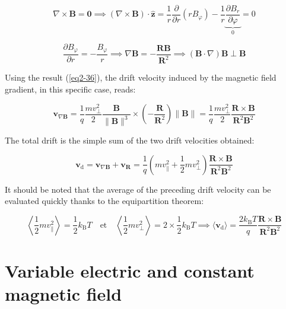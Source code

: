 \begin{equation}
    \nabla\times\mathbf{B}=\mathbf{0}\implies(\nabla\times\mathbf{B})\cdot\mathbf{\hat{z}}=\frac{1}{r}\frac{\partial}{\partial r}(rB_\varphi)-\frac{1}{r}\underbrace{\frac{\partial B_r}{\partial\varphi}}_0=0
\end{equation}

\begin{equation}
    \frac{\partial B_\varphi}{\partial r}=-\frac{B_\varphi}{r}\implies\nabla\mathbf{B}=-\frac{\mathbf{R}\mathbf{B}}{\mathbf{R}^2}\implies\left(\mathbf{B}\cdot\nabla\right)\mathbf{B}\perp\mathbf{B}
\end{equation}

Using the result (\ref{eq2-36}), the drift velocity induced by the magnetic field gradient, in this specific case, reads:

\begin{equation}
    \mathbf{v}_{\nabla\mathbf{B}}=\frac{1}{q}\frac{mv_\perp^2}{2}\frac{\mathbf{B}}{\|\mathbf{B}\|^3}\times\left(-\frac{\mathbf{R}}{\mathbf{R}^2}\right)\|\mathbf{B}\|=\frac{1}{q}\frac{mv_\perp^2}{2}\frac{\mathbf{R}\times\mathbf{B}}{\mathbf{R}^2\mathbf{B}^2}
\end{equation}

The total drift is the simple sum of the two drift velocities obtained:

\begin{equation}
    \label{eq2-48}
    \mathbf{v}_\mathrm{d}=\mathbf{v}_{\nabla\mathbf{B}}+\mathbf{v}_\mathbf{R}=\frac{1}{q}\left(mv_\parallel^2+\frac{1}{2}mv_\perp^2\right)\frac{\mathbf{R}\times\mathbf{B}}{\mathbf{R}^2\mathbf{B}^2}
\end{equation}

It should be noted that the average of the preceding drift velocity can be evaluated quickly thanks to the
equipartition theorem:

\begin{equation}
    \left\langle\frac{1}{2}mv_\parallel^2\right\rangle=\frac{1}{2}k_\text{B}T\quad\text{et}\quad\left\langle\frac{1}{2}mv_\perp^2\right\rangle=2\times\frac{1}{2}k_\text{B}T\implies\langle\mathbf{v}_\mathrm{d}\rangle=\frac{2k_\text{B}T}{q}\frac{\mathbf{R}\times\mathbf{B}}{\mathbf{R}^2\mathbf{B}^2}
\end{equation}

\section{Variable electric and constant magnetic field}

